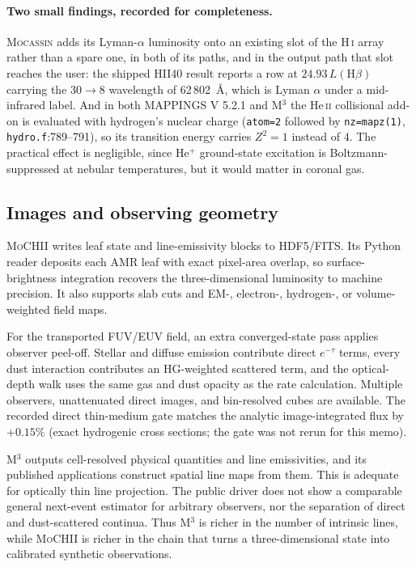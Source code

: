 \documentclass[english,a4paper]{my_memo}
\newcommand{\code}[1]{\texttt{#1}}
\newcommand{\MoCHII}{\textsc{MoCHII}}
\newcommand{\Mthree}{M$^3$}
\newcommand{\Mappings}{MAPPINGS V 5.2.1}
\newcommand{\Mocassin}{\textsc{Mocassin}}
\begin{document}
\paragraph{Two small findings, recorded for completeness.}  \Mocassin{} adds
its Lyman-$\alpha$ luminosity onto an existing slot of the H\,\textsc{i}
array rather than a spare one, in both of its paths, and in the output path
that slot reaches the user: the shipped HII40 result reports a row at
$24.93\,L(\mathrm{H}\beta)$ carrying the $30\rightarrow8$ wavelength of
62\,802~\AA{}, which is Lyman $\alpha$ under a mid-infrared label.  And in
both \Mappings{} and \Mthree{} the He\,\textsc{ii} collisional add-on is
evaluated with hydrogen's nuclear charge (\code{atom=2} followed by
\code{nz=mapz(1)}, \code{hydro.f}:789--791), so its transition energy carries
$Z^2 = 1$ instead of $4$.  The practical effect is negligible, since He$^+$
ground-state excitation is Boltzmann-suppressed at nebular temperatures, but
it would matter in coronal gas.

\subsection{Images and observing geometry}

\MoCHII{} writes leaf state and line-emissivity blocks to HDF5/FITS.  Its
Python reader deposits each AMR leaf with exact pixel-area overlap, so
surface-brightness integration recovers the three-dimensional luminosity
to machine precision.  It also supports slab cuts and EM-, electron-,
hydrogen-, or volume-weighted field maps.

For the transported FUV/EUV field, an extra converged-state pass applies
observer peel-off.  Stellar and diffuse emission contribute direct
$e^{-\tau}$ terms, every dust interaction contributes an HG-weighted
scattered term, and the optical-depth walk uses the same gas and dust
opacity as the rate calculation.  Multiple observers, unattenuated direct
images, and bin-resolved cubes are available.  The recorded direct
thin-medium gate matches the analytic image-integrated flux by $+0.15\%$
(exact hydrogenic cross sections; the gate was not rerun for this memo).

\Mthree{} outputs cell-resolved physical quantities and line emissivities,
and its published applications construct spatial line maps from them.
This is adequate for optically thin line projection.  The public driver
does not show a comparable general next-event estimator for arbitrary
observers, nor the separation of direct and dust-scattered continua.
Thus \Mthree{} is richer in the number of intrinsic lines, while
\MoCHII{} is richer in the chain that turns a three-dimensional state
into calibrated synthetic observations.
\end{document}
